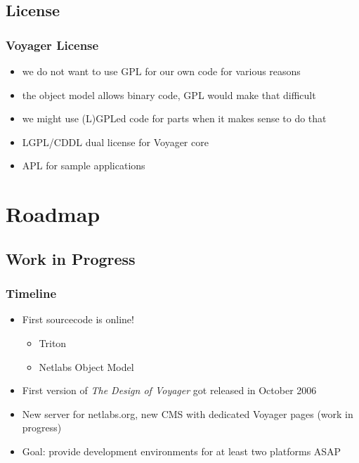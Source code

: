 \documentclass{beamer}
\begin{document}
\subsection{License}

\begin{frame}
\frametitle{Voyager License}
\begin{itemize}[<+->]
  \item we do not want to use GPL for our own code for various reasons
  \item the object model allows binary code, GPL would make that difficult
  \item we might use (L)GPLed code for parts when it makes sense to do that
  \item LGPL/CDDL dual license for Voyager core
  \item APL for sample applications
\end{itemize}
\end{frame}

\section{Roadmap}
\subsection{Work in Progress}

\begin{frame}
\frametitle{Timeline}
\begin{itemize}[<+->]
  \item First sourcecode is online!
  \begin{itemize}[<+->]
    \item Triton
    \item Netlabs Object Model
  \end{itemize}
  \item First version of \textit{The Design of Voyager} got released in October 2006
  \item New server for netlabs.org, new CMS with dedicated Voyager pages (work in progress)
  \item Goal: provide development environments for at least two platforms ASAP
\end{itemize}
\end{frame}
\end{document}
